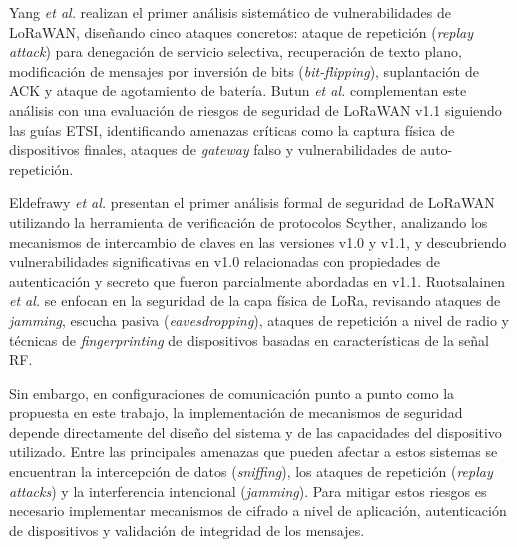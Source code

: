 Yang \textit{et al.} \cite{yang2018vulnerabilities} realizan el primer análisis sistemático de vulnerabilidades de LoRaWAN, diseñando cinco ataques concretos: ataque de repetición (\textit{replay attack}) para denegación de servicio selectiva, recuperación de texto plano, modificación de mensajes por inversión de bits (\textit{bit-flipping}), suplantación de ACK y ataque de agotamiento de batería. Butun \textit{et al.} \cite{butun2019security} complementan este análisis con una evaluación de riesgos de seguridad de LoRaWAN v1.1 siguiendo las guías ETSI, identificando amenazas críticas como la captura física de dispositivos finales, ataques de \textit{gateway} falso y vulnerabilidades de auto-repetición.

Eldefrawy \textit{et al.} \cite{eldefrawy2019formal} presentan el primer análisis formal de seguridad de LoRaWAN utilizando la herramienta de verificación de protocolos Scyther, analizando los mecanismos de intercambio de claves en las versiones v1.0 y v1.1, y descubriendo vulnerabilidades significativas en v1.0 relacionadas con propiedades de autenticación y secreto que fueron parcialmente abordadas en v1.1. Ruotsalainen \textit{et al.} \cite{ruotsalainen2022physical} se enfocan en la seguridad de la capa física de LoRa, revisando ataques de \textit{jamming}, escucha pasiva (\textit{eavesdropping}), ataques de repetición a nivel de radio y técnicas de \textit{fingerprinting} de dispositivos basadas en características de la señal RF.

Sin embargo, en configuraciones de comunicación punto a punto como la propuesta en este trabajo, la implementación de mecanismos de seguridad depende directamente del diseño del sistema y de las capacidades del dispositivo utilizado. Entre las principales amenazas que pueden afectar a estos sistemas se encuentran la intercepción de datos (\textit{sniffing}), los ataques de repetición (\textit{replay attacks}) y la interferencia intencional (\textit{jamming}). Para mitigar estos riesgos es necesario implementar mecanismos de cifrado a nivel de aplicación, autenticación de dispositivos y validación de integridad de los mensajes.



